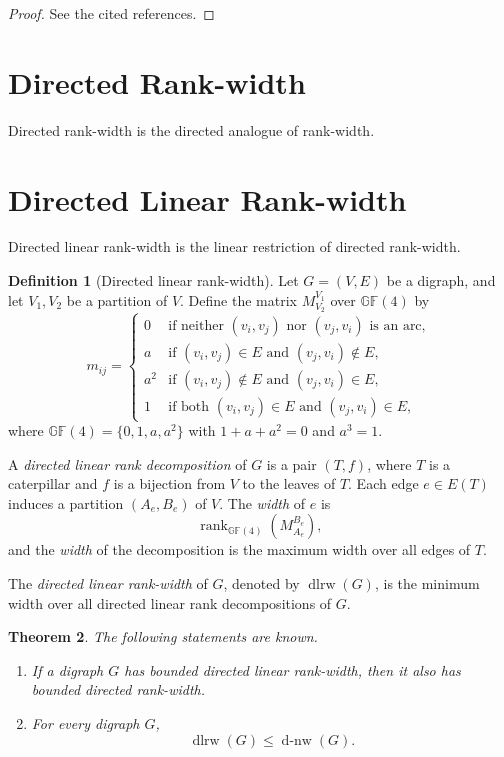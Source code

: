 \documentclass[10pt]{book}
\newtheorem{theorem}{Theorem}[section]
\theoremstyle{definition}
\newtheorem{definition}[theorem]{Definition}
\begin{document}
\begin{proof}
See the cited references.
\end{proof}

\section{Directed Rank-width}
Directed rank-width \cite{71} is the directed analogue of rank-width.

\section{Directed Linear Rank-width}
Directed linear rank-width \cite{69} is the linear restriction of directed rank-width.

\begin{definition}[Directed linear rank-width]
\cite{69}
Let \(G=(V,E)\) be a digraph, and let \(V_1,V_2\) be a partition of \(V\).  
Define the matrix \(M_{V_2}^{V_1}\) over \(\mathbb{GF}(4)\) by
\[
m_{ij}=
\begin{cases}
0 & \text{if neither } (v_i,v_j) \text{ nor } (v_j,v_i) \text{ is an arc},\\
a & \text{if } (v_i,v_j)\in E \text{ and } (v_j,v_i)\notin E,\\
a^2 & \text{if } (v_i,v_j)\notin E \text{ and } (v_j,v_i)\in E,\\
1 & \text{if both } (v_i,v_j)\in E \text{ and } (v_j,v_i)\in E,
\end{cases}
\]
where \(\mathbb{GF}(4)=\{0,1,a,a^2\}\) with \(1+a+a^2=0\) and \(a^3=1\).

A \emph{directed linear rank decomposition} of \(G\) is a pair \((T,f)\), where \(T\) is a caterpillar and \(f\) is a bijection from \(V\) to the leaves of \(T\).  
Each edge \(e\in E(T)\) induces a partition \((A_e,B_e)\) of \(V\).  
The \emph{width} of \(e\) is
\[
\operatorname{rank}_{\mathbb{GF}(4)}(M_{A_e}^{B_e}),
\]
and the \emph{width} of the decomposition is the maximum width over all edges of \(T\).

The \emph{directed linear rank-width} of \(G\), denoted by \(\operatorname{dlrw}(G)\), is the minimum width over all directed linear rank decompositions of \(G\).
\end{definition}

\begin{theorem}
The following statements are known.
\begin{enumerate}
    \item If a digraph \(G\) has bounded directed linear rank-width, then it also has bounded directed rank-width.

    \item For every digraph \(G\),
    \[
    \operatorname{dlrw}(G)\leq \operatorname{d\mbox{-}nw}(G).
    \]
    \cite{69}
\end{enumerate}
\end{theorem}
\end{document}
